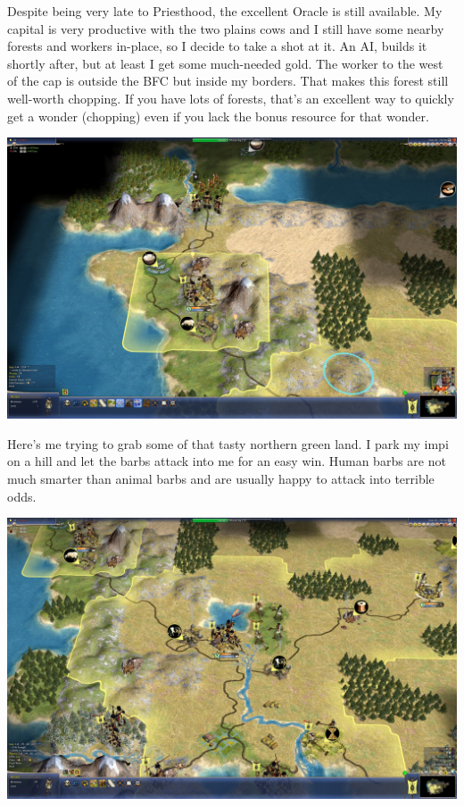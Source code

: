 \documentclass[10pt]{article}
\begin{document}
Despite being very late to Priesthood, the excellent Oracle is still available. My capital is very productive
with the two plains cows and I still have some nearby forests and workers in-place, so I decide to take a
shot at it. An AI, builds it shortly after, but at least I get some much-needed gold. The worker to the west
of the cap is outside the BFC but inside my borders. That makes this forest still well-worth chopping.
If you have lots of forests, that's an excellent way to quickly get a wonder (chopping) even if you lack
the bonus resource for that wonder.

\includegraphics[width=1.0\textwidth]{50}

Here's me trying to grab some of that tasty northern green land. I park my impi on a hill and let the
barbs attack into me for an easy win. Human barbs are not much smarter than animal barbs and are usually
happy to attack into terrible odds.

\includegraphics[width=1.0\textwidth]{51}
\end{document}
